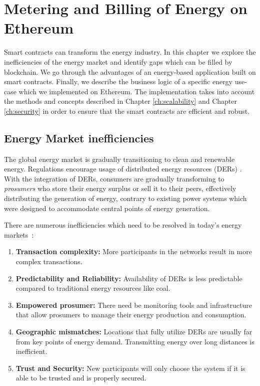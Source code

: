 \chapter{Metering and Billing of Energy on Ethereum}\label{ch:implementation}

Smart contracts can transform the energy industry. In this chapter we explore the inefficiencies of the energy market and identify gaps which can be filled by blockchain. We go through the advantages of an energy-based application built on smart contracts. Finally, we describe the business logic of a specific energy use-case which we implemented on Ethereum. The implementation takes into account the methods and concepts described in Chapter \ref{ch:scalability} and Chapter \ref{ch:security} in order to ensure that the smart contracts are efficient and robust.


\section{Energy Market inefficiencies}

The global energy market is gradually transitioning to clean and renewable energy. Regulations encourage usage of distributed energy resources (DERs) \cite{europe2030}. With the integration of DERs, consumers are gradually transforming to \textit{prosumers} who store their energy surplus or sell it to their peers, effectively distributing the generation of energy, contrary to existing power systems which were designed to accommodate central points of energy generation.

There are numerous inefficiencies which need to be resolved in today's energy markets~\cite{ey-inefficiencies}:
\begin{enumerate}
    \item \textbf{Transaction complexity:} More participants in the networks result in more complex transactions.
    \item \textbf{Predictability and Reliability:} Availability of DERs is less predictable compared to traditional energy resources like coal. 
    \item \textbf{Empowered prosumer:} There need be monitoring tools and infrastructure that allow prosumers to manage their energy production and consumption.
    \item \textbf{Geographic mismatches:} Locations that fully utilize DERs are usually far from key points of energy demand. Transmitting energy over long distances is inefficient.
    \item \textbf{Trust and Security:} New participants will only choose the system if it is able to be trusted and is properly secured.
\end{enumerate}

